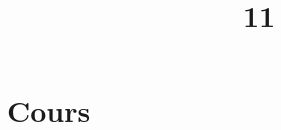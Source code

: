 \documentclass[a4paper]{article}
\title{11}{Variables aléatoires}
\begin{document}
	\part{Cours}
	
	
	
	
	
\end{document}

